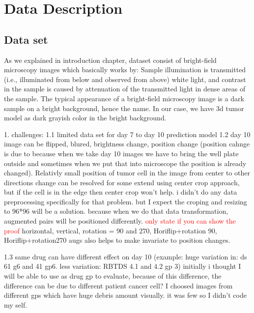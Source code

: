 \chapter{Data Description}\label{ch: Data Description}
\section{Data set}
\label{sec:Data set}

As we explained in introduction chapter, dataset consist of bright-field microscopy images which 
basically works by: 
Sample illumination is transmitted (i.e., illuminated from below and observed from above) 
white light, and contrast
in the sample is caused by attenuation of the transmitted light in dense areas of the sample. The
 typical appearance 
of a bright-field microscopy image is a dark sample on a bright background, hence the name.
In our case, we have   3d tumor model as dark grayish color in the bright background.

1. challenges:
1.1 limited data set for day 7 to day 10 prediction model
1.2 day 10  image can be flipped, blured, brightness change, position change (position cahnge is due to because when we take day 10 images we have to bring the
 well plate outside and sometimes
 when we put that into microscope the position is already changed). Relativly small position of tumor cell in the image from center to other directions change  can 
be resolved for some extend using center crop approach, but if the cell is in the edge then center crop won't help. i didn't do any data
 preprocessing
 specifically for that problem. but I expect the croping and resizing to 96*96 will be a solution. because 
 when we do that 
 data transformation, augmented pairs will be positioned differently.  \textcolor{red}{only state if you can show the proof} 
 horizontal, vertical, rotation = 90 and 270, Horiflip+rotation 90,
  Horiflip+rotation270 
 augs also helps to make invariate to position changes.
 

1.3 same drug can have different effect on day 10 (example: huge variation in: ds 61 g6 and 41 gp6. less variation: 
RBTDS 4.1 and 4.2 gp 3) initially i thought I will be able to use 
as drug gp to evaluate, because of this difference, the difference can be due to different patient cancer cell?
I choosed images from different gps which have huge debris amount visually. it was few so I didn't code my self.


